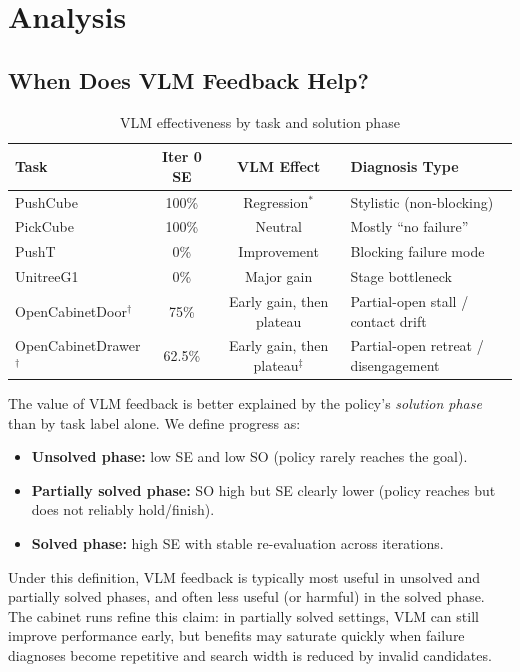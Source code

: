 \documentclass[conference]{IEEEtran}
\begin{document}
\section{Analysis}\label{sec:analysis}

\subsection{When Does VLM Feedback Help?}

\begin{table}[htbp]
\caption{VLM effectiveness by task and solution phase}
\label{tab:vlm_effectiveness}
\centering
\begin{tabular}{lccl}
\toprule
Task & Iter 0 SE & VLM Effect & Diagnosis Type \\
\midrule
PushCube & 100\% & Regression$^*$ & Stylistic (non-blocking) \\
PickCube & 100\% & Neutral & Mostly ``no failure'' \\
PushT & 0\% & Improvement & Blocking failure mode \\
UnitreeG1 & 0\% & Major gain & Stage bottleneck \\
OpenCabinetDoor$^\dagger$ & 75\% & Early gain, then plateau & Partial-open stall / contact drift \\
OpenCabinetDrawer$^\dagger$ & 62.5\% & Early gain, then plateau$^\ddagger$ & Partial-open retreat / disengagement \\
\bottomrule
\end{tabular}
\end{table}


The value of VLM feedback is better explained by the policy's \emph{solution
phase} than by task label alone. We define progress as:
\begin{itemize}
  \item \textbf{Unsolved phase:} low SE and low SO (policy rarely reaches the goal).
  \item \textbf{Partially solved phase:} SO high but SE clearly lower (policy reaches but does not reliably hold/finish).
  \item \textbf{Solved phase:} high SE with stable re-evaluation across iterations.
\end{itemize}
Under this definition, VLM feedback is typically most useful in unsolved and
partially solved phases, and often less useful (or harmful) in the solved phase.
The cabinet runs refine this claim: in partially solved settings, VLM can still
improve performance early, but benefits may saturate quickly when failure
diagnoses become repetitive and search width is reduced by invalid candidates.
\end{document}
